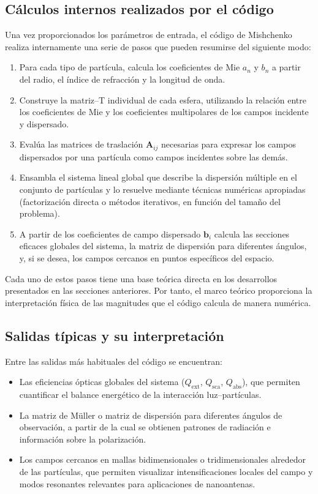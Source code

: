 \documentclass[12pt,a4paper]{article}
\begin{document}
\subsection{Cálculos internos realizados por el código}

Una vez proporcionados los parámetros de entrada, el código de Mishchenko realiza internamente una serie de pasos que pueden resumirse del siguiente modo:

\begin{enumerate}
  \item Para cada tipo de partícula, calcula los coeficientes de Mie $a_n$ y $b_n$ a partir del radio, el índice de refracción y la longitud de onda.
  \item Construye la matriz--T individual de cada esfera, utilizando la relación entre los coeficientes de Mie y los coeficientes multipolares de los campos incidente y dispersado.
  \item Evalúa las matrices de traslación $\mathbf{A}_{ij}$ necesarias para expresar los campos dispersados por una partícula como campos incidentes sobre las demás.
  \item Ensambla el sistema lineal global que describe la dispersión múltiple en el conjunto de partículas y lo resuelve mediante técnicas numéricas apropiadas
        (factorización directa o métodos iterativos, en función del tamaño del problema).
  \item A partir de los coeficientes de campo dispersado $\mathbf{b}_i$ calcula las secciones eficaces globales del sistema, la matriz de dispersión para diferentes ángulos,
        y, si se desea, los campos cercanos en puntos específicos del espacio.
\end{enumerate}

Cada uno de estos pasos tiene una base teórica directa en los desarrollos presentados en las secciones anteriores.
Por tanto, el marco teórico proporciona la interpretación física de las magnitudes que el código calcula de manera numérica.

\subsection{Salidas típicas y su interpretación}

Entre las salidas más habituales del código se encuentran:

\begin{itemize}
  \item Las eficiencias ópticas globales del sistema ($Q_{\text{ext}}$, $Q_{\text{sca}}$, $Q_{\text{abs}}$), que permiten cuantificar el balance energético de la interacción luz--partículas.
  \item La matriz de Müller o matriz de dispersión para diferentes ángulos de observación, a partir de la cual se obtienen patrones de radiación e información sobre la polarización.
  \item Los campos cercanos en mallas bidimensionales o tridimensionales alrededor de las partículas, que permiten visualizar intensificaciones locales del campo
        y modos resonantes relevantes para aplicaciones de nanoantenas.
\end{itemize}
\end{document}
